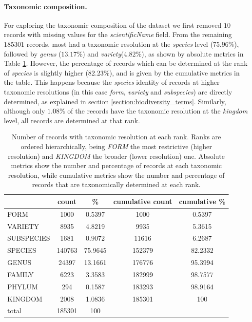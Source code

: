 \paragraph*{Taxonomic composition.}
% 
For exploring the taxonomic composition of the dataset we first removed $10$ records with missing values for the \textit{scientificName} field.
From the remaining $185301$ records, most had a taxonomic resolution at the \textit{species} level ($75.96\%$), followed by \textit{genus} ($13.17\%$) and \textit{variety}($4.82\%$), as shown by absolute metrics in Table \ref{table:dset_taxonomicres_counts}. 
However, the percentage of records which can be determined at the rank of \textit{species} is slightly higher ($82.23\%$), and is given by the cumulative metrics in the table. 
This happens because the \textit{species} identity of records at higher taxonomic resolutions (in this case \textit{form}, \textit{variety} and \textit{subspecies}) are directly determined, as explained in section \ref{section:biodiversity_terms}.
Similarly, although only $1.08\%$ of the records have the taxonomic resolution at the \textit{kingdom} level, all records are determined at that rank.

\begin{table}
  \caption[Number of records with taxonomic resolution at each rank.]{Number of records with taxonomic resolution at each rank. Ranks are ordered hierarchically, being \textit{FORM} the most restrictive (higher resolution) and \textit{KINGDOM} the broader (lower resolution) one. Absolute metrics show the number and percentage of records at each taxonomic resolution, while cumulative metrics show the number and percentage of records that are taxonomically determined at each rank.}
  \begin{center}
  \begin{tabular}{l c c c c}
       & count & \% & cumulative count & cumulative \% \\
      \hline
      FORM & 1000 & 0.5397 & 1000 & 0.5397\\
      VARIETY & 8935 & 4.8219 & 9935 & 5.3615\\
      SUBSPECIES & 1681 & 0.9072 & 11616 & 6.2687\\
      SPECIES & 140763 & 75.9645 & 152379 & 82.2332\\
      GENUS & 24397 & 13.1661 & 176776 & 95.3994\\
      FAMILY & 6223 & 3.3583 & 182999 & 98.7577\\
      PHYLUM & 294 & 0.1587 & 183293 & 98.9164\\
      KINGDOM & 2008 & 1.0836 & 185301 & 100\\
      \hline
      total & 185301 & 100 & &
  \end{tabular}
  \end{center}
  \label{table:dset_taxonomicres_counts}
\end{table}


